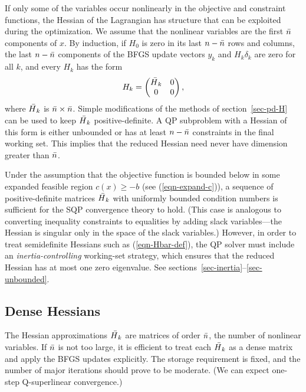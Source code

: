 \documentclass[draft,leqno,onefignum,onetabnum]{siamltex}
\def\Hbar{\skew5\bar H}
\def\nbar{\skew2\bar n}
\newcommand{\pmat}[1]{\begin{pmatrix}#1\end{pmatrix}}
\begin{document}
 If only some of the variables occur nonlinearly in the objective and
constraint functions, the Hessian of the Lagrangian has structure that
can be exploited during the optimization.  We assume that the
nonlinear variables are the first $\nbar$ components of $x$.  By
induction, if $H_0$ is zero in its last $n-\nbar$ rows and columns,
the last $n-\nbar$ components of the BFGS update vectors $y_k$ and
$H_k \delta_k$ are zero for all $k$, and every $H_k$ has the form
\begin{equation}                                   \label{eqn-Hbar-def}
        H_k = \pmat{ \Hbar_k & 0
                  \\   0     & 0 },
\end{equation}
where $\Hbar_k$ is $\nbar\times\nbar$.  Simple modifications of the
methods of section~\ref{sec-pd-H} can be used to keep $\Hbar_k$
positive-definite.  A QP subproblem with a Hessian of this form is
either unbounded or has at least $n - \nbar$ constraints in the final
working set. This implies that the reduced Hessian need never have
dimension greater than $\nbar$.

Under the assumption that the objective function is bounded below in
some expanded feasible region $c(x) \ge - b$ (see
(\ref{eqn-expand-c})), a sequence of positive-definite matrices
$\Hbar_k$ with uniformly bounded condition numbers is sufficient for
the SQP convergence theory to hold.  (This case is analogous to
converting inequality constraints to equalities by adding slack
variables---the Hessian is singular only in the space of the slack
variables.)  However, in order to treat semidefinite Hessians such as
(\ref{eqn-Hbar-def}), the QP solver must include an
\emph{inertia-controlling} working-set strategy, which ensures that
the reduced Hessian has at most one zero eigenvalue.  See
sections~\ref{sec-inertia}--\ref{sec-unbounded}.


 \subsection{Dense Hessians}  \label{sec-DenseH}

The Hessian approximations $\Hbar_k$ are matrices of order $\nbar$, the
number of nonlinear variables.  If $\nbar$ is not too large, it is
efficient to treat each $\Hbar_k$ as a dense matrix and apply the BFGS
updates explicitly.  The storage requirement is fixed, and the number
of major iterations should prove to be moderate.  (We can expect
one-step Q-superlinear convergence.)
\end{document}
